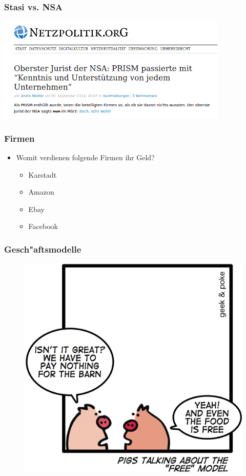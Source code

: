 \documentclass[12pt]{beamer}
\begin{document}
\begin{frame}
  \frametitle{Stasi vs. NSA}
    \begin{center}
      \includegraphics[height=5cm]{img/prism_netzpolitik.png}
    \end{center}
\end{frame}

\begin{frame}
  \frametitle{Firmen}

  \begin{itemize}
    \item Womit verdienen folgende Firmen ihr Geld?
      \begin{itemize}
        \item<2-> Karstadt
        \item<3-> Amazon
        \item<4-> Ebay
        \item<5-> Facebook
      \end{itemize}
  \end{itemize}
\end{frame}

\begin{frame}
  \frametitle{Gesch"aftsmodelle}
  \begin{figure}
    \includegraphics[height=0.7\textheight]{img/business_pigs.jpg}
  \end{figure}
\end{frame}
\end{document}
